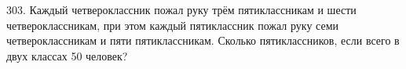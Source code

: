 303. Каждый четвероклассник пожал руку трём пятиклассникам и шести четвероклассникам, при этом каждый пятиклассник пожал руку семи четвероклассникам и пяти пятиклассникам. Сколько пятиклассников, если всего в двух классах 50 человек?\\
